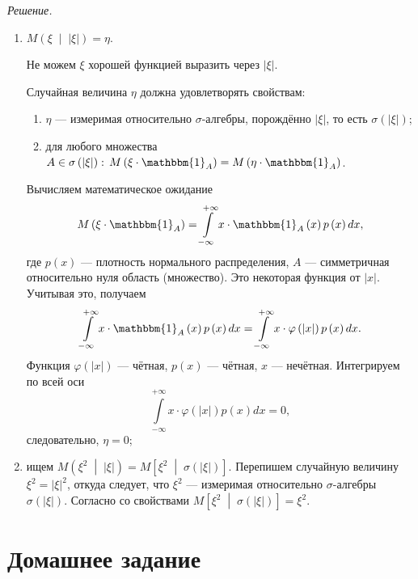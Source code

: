 \textit{Решение.}
\begin{enumerate}[label=\alph*)]
  \item $M \left( \xi \; \middle| \; \left| \xi \right| \right) =
    \eta $.

  Не можем $ \xi $ хорошей функцией выразить через $ \left| \xi \right| $.

  Случайная величина $ \eta $ должна удовлетворять свойствам:
  \begin{enumerate}
    \item $ \eta $ --- измеримая относительно $ \sigma $-алгебры, порождённо $ \left| \xi \right| $,
    то есть $ \sigma \left( \left| \xi \right| \right) $;
    \item для любого множества
    $A \in \sigma \left( \left| \xi \right| \right): \,
    M \left( \xi \cdot \mathbbm{1}_A \right) = M \left( \eta \cdot \mathbbm{1}_A \right) $.
  \end{enumerate}

  Вычисляем математическое ожидание
  $$M \left( \xi \cdot \mathbbm{1}_A \right) =
    \int \limits_{- \infty }^{+ \infty }
      x \cdot \mathbbm{1}_A \left( x \right) p \left( x \right) dx,$$
  где $p \left( x \right) $ --- плотность нормального распределения, $A$ ---
  симметричная относительно нуля область (множество).
  Это некоторая функция от $ \left| x \right| $.
  Учитывая это, получаем
  $$ \int \limits_{- \infty }^{+ \infty }
      x \cdot \mathbbm{1}_A \left( x \right) p \left( x \right) dx =
    \int \limits_{- \infty }^{+ \infty }
      x \cdot \varphi \left( \left| x \right| \right) p \left( x \right) dx.$$
  Функция $ \varphi \left( \left| x \right| \right) $ --- чётная, $p \left( x \right) $ --- чётная,
  $x$ --- нечётная.
  Интегрируем по всей оси
  $$ \int \limits_{- \infty }^{+ \infty }
      x \cdot \varphi \left( \left| x \right| \right) p \left( x \right) dx =
    0,$$
  следовательно, $ \eta = 0$;

  \item ищем
  $M \left( \xi^2 \; \middle| \; \left| \xi \right| \right) =
    M \left[ \xi^2 \; \middle| \; \sigma \left( \left| \xi \right| \right) \right] $.
  Перепишем случайную величину $ \xi^2 = \left| \xi \right|^2$, откуда следует, что $ \xi^2$ ---
  измеримая относительно $ \sigma $-алгебры $ \sigma \left( \left| \xi \right| \right) $.
  Согласно со свойствами
  $M \left[ \xi^2 \; \middle| \; \sigma \left( \left| \xi \right| \right) \right] =
    \xi^2.$
\end{enumerate}

\section*{Домашнее задание}
